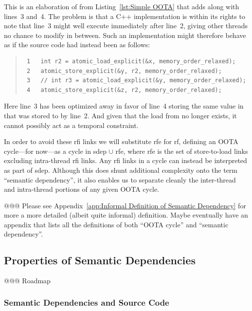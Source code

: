 \documentclass[10]{article}
\begin{document}
\noindent
This is an elaboration of  from
Listing~\ref{lst:Simple OOTA}
that adds  along with lines~3 and~4.
The problem is that a C++ implementation is within its rights to
note that line~3 might well execute immediately after line~2, giving
other threads no chance to modify  in between.
Such an implementation might therefore behave as if the source code
had instead been as follows:

\begin{quote}
\scriptsize
\begin{verbatim}
 1   int r2 = atomic_load_explicit(&x, memory_order_relaxed);
 2   atomic_store_explicit(&y, r2, memory_order_relaxed);
 3   // int r3 = atomic_load_explicit(&y, memory_order_relaxed);
 4   atomic_store_explicit(&z, r2, memory_order_relaxed);
\end{verbatim}
\end{quote}

\noindent
Here line~3 has been optimized away in favor of line~4 storing the same value
in  that was stored to  by line~2.
And given that the load from  no longer exists, it cannot possibly
act as a temporal constraint.

In order to avoid these rfi links we will substitute rfe
for rf, defining an OOTA cycle---for now---as a cycle in sdep $\cup$ rfe,
where rfe is the set of store-to-load links excluding intra-thread rfi links.
Any rfi links in a cycle can instead be interpreted as part of sdep.
Although this does shunt additional complexity onto the term
``semantic dependency'', it also enables us to separate cleanly
the inter-thread and intra-thread portions of any given OOTA cycle.

@@@ Please see
Appendix~\ref{app:Informal Definition of Semantic Dependency}
for more a more detailed (albeit quite informal) definition.
Maybe eventually have an appendix that lists all the definitions
of both ``OOTA cycle'' and ``semantic dependency''.

\subsection{Properties of Semantic Dependencies}
\label{sec:Properties of Semantic Dependencies}

@@@ Roadmap

\subsubsection{Semantic Dependencies and Source Code}
\label{sec:Semantic Dependencies and Source Code}
\end{document}
